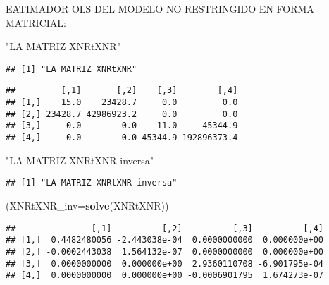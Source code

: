 \documentclass[
]{article}
\newenvironment{Shaded}{\begin{snugshade}}{\end{snugshade}}
\newcommand{\DataTypeTok}[1]{\textcolor[rgb]{0.13,0.29,0.53}{#1}}
\newcommand{\KeywordTok}[1]{\textcolor[rgb]{0.13,0.29,0.53}{\textbf{#1}}}
\newcommand{\NormalTok}[1]{#1}
\newcommand{\OperatorTok}[1]{\textcolor[rgb]{0.81,0.36,0.00}{\textbf{#1}}}
\newcommand{\StringTok}[1]{\textcolor[rgb]{0.31,0.60,0.02}{#1}}
\begin{document}
EATIMADOR OLS DEL MODELO NO RESTRINGIDO EN FORMA MATRICIAL:

\begin{Shaded}
\begin{Highlighting}[]
\StringTok{"LA MATRIZ XNRtXNR"}
\end{Highlighting}
\end{Shaded}

\begin{verbatim}
## [1] "LA MATRIZ XNRtXNR"
\end{verbatim}

\begin{Shaded}
\end{Shaded}

\begin{verbatim}
##         [,1]       [,2]    [,3]        [,4]
## [1,]    15.0    23428.7     0.0         0.0
## [2,] 23428.7 42986923.2     0.0         0.0
## [3,]     0.0        0.0    11.0     45344.9
## [4,]     0.0        0.0 45344.9 192896373.4
\end{verbatim}

\begin{Shaded}
\begin{Highlighting}[]
\StringTok{"LA MATRIZ XNRtXNR inversa"}
\end{Highlighting}
\end{Shaded}

\begin{verbatim}
## [1] "LA MATRIZ XNRtXNR inversa"
\end{verbatim}

\begin{Shaded}
\begin{Highlighting}[]
\NormalTok{(}\DataTypeTok{XNRtXNR_inv=}\KeywordTok{solve}\NormalTok{(XNRtXNR))}
\end{Highlighting}
\end{Shaded}

\begin{verbatim}
##               [,1]          [,2]          [,3]          [,4]
## [1,]  0.4482480056 -2.443038e-04  0.0000000000  0.000000e+00
## [2,] -0.0002443038  1.564132e-07  0.0000000000  0.000000e+00
## [3,]  0.0000000000  0.000000e+00  2.9360110708 -6.901795e-04
## [4,]  0.0000000000  0.000000e+00 -0.0006901795  1.674273e-07
\end{verbatim}
\end{document}
